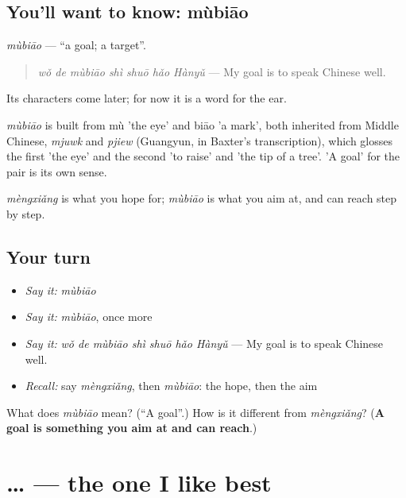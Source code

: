\subsection*{You'll want to know: mùbiāo}
\emph{mùbiāo} — \textquotedblleft{}a goal; a target\textquotedblright{}.

\begin{quote}
\emph{wǒ de mùbiāo shì shuō hǎo Hànyǔ} — My goal is to speak Chinese well.
\end{quote}

Its characters come later; for now it is a word for the ear.

\begin{cousinweb}
\emph{mùbiāo} is built from mù 'the eye' and biāo 'a mark', both inherited from Middle Chinese, \emph{mjuwk} and \emph{pjiew} (Guangyun, in Baxter's transcription), which glosses the first 'the eye' and the second 'to raise' and 'the tip of a tree'. 'A goal' for the pair is its own sense.
\end{cousinweb}

\begin{grammarlens}[title={What you've built}]
\emph{mèngxiǎng} is what you hope for; \emph{mùbiāo} is what you aim at, and can reach step by step.
\end{grammarlens}

\subsection*{Your turn}
\begin{itemize}
\raggedright
  \item \emph{Say it:} \emph{mùbiāo}
  \item \emph{Say it:} \emph{mùbiāo}, once more
  \item \emph{Say it:} \emph{wǒ de mùbiāo shì shuō hǎo Hànyǔ} — My goal is to speak Chinese well.
  \item \emph{Recall:} say \emph{mèngxiǎng}, then \emph{mùbiāo}: the hope, then the aim
\end{itemize}

\begin{tcolorbox}[breakable,colback=teal!4,colframe=teal!35!black,title={Before you move on}]
What does \emph{mùbiāo} mean? (\textquotedblleft{}A goal\textquotedblright{}.) How is it different from \emph{mèngxiǎng}? (\textbf{A goal is something you aim at and can reach}.)
\end{tcolorbox}
\section[\texorpdfstring{\zh{我最喜欢}… (wǒ zuì xǐhuan …)}{我最喜欢… (wǒ zuì xǐhuan …)}]{… — the one I like best}

